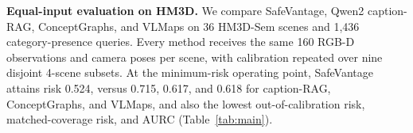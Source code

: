 \documentclass[letterpaper, 10 pt, conference]{ieeeconf}
\newcommand{\method}{SafeVantage}
\begin{document}
    \textbf{Equal-input evaluation on HM3D.}
    We compare \method{}, Qwen2 caption-RAG, ConceptGraphs, and VLMaps on 36 HM3D-Sem scenes and 1,436 category-presence queries. Every method receives the same 160 RGB-D observations and camera poses per scene, with calibration repeated over nine disjoint 4-scene subsets. At the minimum-risk operating point, \method{} attains risk 0.524, versus 0.715, 0.617, and 0.618 for caption-RAG, ConceptGraphs, and VLMaps, and also the lowest out-of-calibration risk, matched-coverage risk, and AURC (Table~\ref{tab:main}).

    
\end{document}

